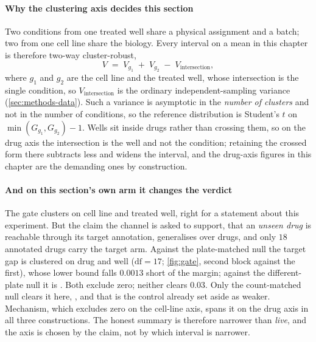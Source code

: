 \paragraph{Why the clustering axis decides this section} Two conditions from one
treated well share a physical assignment and a batch; two from one cell line
share the biology. Every interval on a mean in this chapter is therefore two-way
cluster-robust,
\begin{equation}
 V \;=\; V_{g_1} \;+\; V_{g_2} \;-\; V_{\textrm{intersection}},
 \label{eq:cgm}
\end{equation}
where $g_1$ and $g_2$ are the cell line and the treated well, whose intersection
is the single condition, so $V_{\textrm{intersection}}$ is the ordinary
independent-sampling variance (\cref{sec:methods-data}). Such a variance is
asymptotic in the \emph{number of clusters} and not in the number of conditions,
so the reference distribution is Student's $t$ on $\min(G_{g_1},G_{g_2}) - 1$.
Wells sit inside drugs rather than crossing them, so on the drug axis the
intersection is the well and not the condition; retaining the crossed form there
subtracts less and widens the interval, and the drug-axis figures in this chapter
are the demanding ones by construction.

\paragraph{And on this section's own arm it changes the verdict} The gate
clusters on cell line and treated well, right for a statement about this
experiment. But the claim the channel is asked to support, that an \emph{unseen
drug} is reachable through its target annotation, generalises over drugs, and
only $18$ annotated drugs carry the target arm. Against the plate-matched null
the target gap is  clustered on drug and well
($\mathrm{df} = 17$; \cref{fig:gate}, second block against the first), whose
lower bound falls $0.0013$ short of the margin;
against the different-plate null it is . Both
exclude zero; neither clears $0.03$. Only the count-matched null clears it here,
, and that is the control already set aside as
weaker. Mechanism, which excludes zero on the cell-line axis, spans it on the
drug axis in all three constructions. The honest summary is therefore narrower
than \emph{live}, and the axis is chosen by the claim, not by which interval is
narrower.

